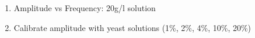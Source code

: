 \begin{enumerate}
	\item Amplitude vs Frequency: 20g/l solution
	\item Calibrate amplitude with yeast solutions (1\%, 2\%, 4\%, 10\%, 20\%)
\end{enumerate}